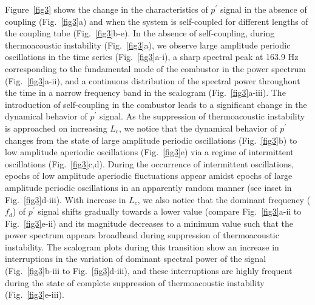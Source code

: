 \documentclass[twocolumn,10pt]{article} %
\begin{document}
Figure~\ref{fig3} shows the change in the characteristics of $p^{\prime}$ signal in the absence of coupling (Fig.~\ref{fig3}a) and when the system is self-coupled for different lengths of the coupling tube (Fig.~\ref{fig3}b-e). In the absence of self-coupling, during thermoacoustic instability (Fig.~\ref{fig3}a), we observe large amplitude periodic oscillations in the time series (Fig.~\ref{fig3}a-i), a sharp spectral peak at 163.9 Hz corresponding to the fundamental mode of the combustor in the power spectrum (Fig.~\ref{fig3}a-ii), and a continuous distribution of the spectral power throughout the time in a narrow frequency band in the scalogram (Fig.~\ref{fig3}a-iii). The introduction of self-coupling in the combustor leads to a significant change in the dynamical behavior of $p^{\prime}$ signal. As the suppression of thermoacoustic instability is approached on increasing $L_{\text{c}}$, we notice that the dynamical behavior of $p^{\prime}$ changes from the state of large amplitude periodic oscillations (Fig.~\ref{fig3}b) to low amplitude aperiodic oscillations (Fig.~\ref{fig3}e) via a regime of intermittent oscillations (Fig.~\ref{fig3}c,d). During the occurrence of intermittent oscillations, epochs of low amplitude aperiodic fluctuations appear amidst epochs of large amplitude periodic oscillations in an apparently random manner (see inset in Fig.~\ref{fig3}d-iii). With increase in $L_c$, we also notice that the dominant frequency ($f_d$) of $p^{\prime}$ signal shifts gradually towards a lower value (compare Fig.~\ref{fig3}a-ii to Fig.~\ref{fig3}e-ii) and its magnitude decreases to a minimum value such that the power spectrum appears broadband during suppression of thermoacoustic instability. The scalogram plots during this transition show an increase in interruptions in the variation of dominant spectral power of the signal (Fig.~\ref{fig3}b-iii to Fig.~\ref{fig3}d-iii), and these interruptions are highly frequent during the state of complete suppression of thermoacoustic instability (Fig.~\ref{fig3}e-iii).
\end{document}
